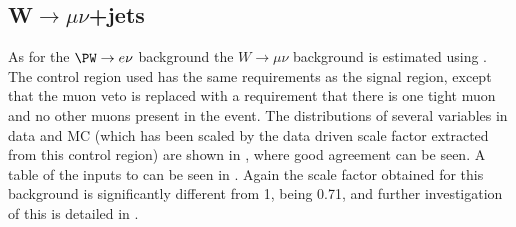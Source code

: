 \subsection{W$\rightarrow \mu\nu$+jets}%
\label{sec:parkedwmunu}
As for the $\PW\rightarrow e\nu$ background the $W\rightarrow \mu\nu$ background is estimated using . The control region used has the same requirements as the signal region, except that the muon veto is replaced with a requirement that there is one tight muon and no other muons present in the event. The distributions of several variables in data and \ac{MC} (which has been scaled by the data driven scale factor extracted from this control region) are shown in , where good agreement can be seen. A table of the inputs to  can be seen in . Again the scale factor obtained  for this background is significantly different from 1, being 0.71, and further investigation of this is detailed in .

